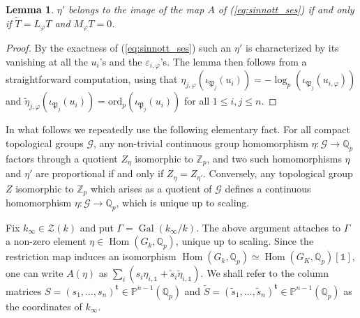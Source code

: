 \documentclass[12pt]{amsart}
\newcommand\bP{\mathbb{P}}
\newcommand\Zp{{\mathbb{Z}_p}}
\newcommand\Qp{{\mathbb{Q}_p}}
\newcommand\cG{\mathcal{G}}
\newcommand\gP{\mathfrak{P}}
\newcommand\sZ{\mathscr{Z}}
\newcommand{\ord}{\mathrm{ord}}
\DeclareMathOperator{\Gal}{Gal}
\DeclareMathOperator{\Hom}{Hom}
\theoremstyle{defstyle}
\theoremstyle{thmstyle}
\newtheorem{lemme}[subsubsection]{Lemma}
\begin{document}
	\begin{lemme}\label{lem:T_and_tilde_T}
		$\eta'$ belongs to the image of the map $A$ of (\ref{eq:sinnott_ses}) if and only if $\tilde{T}=L_\varphi T$ and $M_\varphi T=0$.
	\end{lemme}
	\begin{proof}
		By the exactness of (\ref{eq:sinnott_ses}) such an $\eta'$ is characterized by its vanishing at all the $u_{i}$'s and the $\varepsilon_{i,\varphi}$'s.
		The lemma then follows from a straightforward computation, using that $\eta_{j,\varphi}(\iota_{\gP_j}(u_i))=-\log_p(\iota_{\gP_j}(u_{i,\varphi}))$ and $\tilde{\eta}_{j,\varphi}(\iota_{\gP_j}(u_i))=\ord_p(\iota_{\gP_j}(u_{i}))$ for all $1\leq i,j\leq n$. 
	\end{proof}
	
	In what follows we repeatedly use the following elementary fact. For all compact topological groups $\cG$, any non-trivial continuous group homomorphism $\eta \colon \cG \to \Qp$ factors through a quotient $Z_\eta$ isomorphic to $\Zp$, and two such homomorphisms $\eta$ and $\eta'$ are proportional if and only if $Z_\eta=Z_{\eta'}$. Conversely, any topological group $Z$ isomorphic to $\Zp$ which arises as a quotient of $\cG$ defines a continuous homomorphism $\eta \colon \cG \to\Qp$, which is unique up to scaling.
	
	Fix $k_\infty \in \sZ(k)$ and put $\Gamma=\Gal(k_\infty/k)$. The above argument attaches to $\Gamma$ a non-zero element $\eta \in \Hom(G_k,\Qp)$, unique up to scaling. Since the restriction map induces an isomorphism $\Hom(G_k,\Qp) \simeq \Hom(G_K,\Qp)[\mathds{1}]$, one can write $A(\eta)$ as $\sum_i (s_i \eta_{i,\mathds{1}}+ \tilde{s}_i \tilde{\eta}_{i,\mathds{1}})$. We shall refer to the column matrices $S=(s_1,\ldots,s_n)^\textbf{t} \in \bP^{n-1}(\Qp)$ and $\tilde{S}=(\tilde{s}_1,\ldots,\tilde{s}_n)^\textbf{t}\in \bP^{n-1}(\Qp)$ as the coordinates of $k_\infty$. 
	
\end{document}
